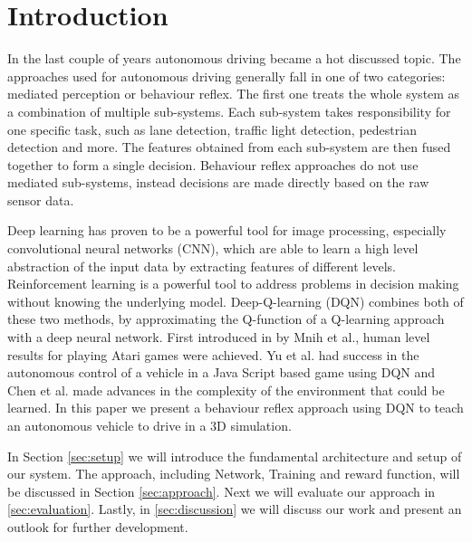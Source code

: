 
\section{Introduction}

In the last couple of years autonomous driving became a hot discussed topic. The approaches used for autonomous driving generally fall in one of two categories: mediated perception or behaviour reflex. The first one treats the whole system as a combination of multiple sub-systems. Each sub-system takes responsibility for one specific task, such as lane detection, traffic light detection, pedestrian detection and more. The features obtained from each sub-system are then fused together to form a single decision. Behaviour reflex approaches do not use mediated sub-systems, instead decisions are made directly based on the raw sensor data.

Deep learning has proven to be a powerful tool for image processing, especially convolutional neural networks (CNN), which are able to learn a high level abstraction of the input data by extracting features of different levels. Reinforcement learning is a powerful tool to address problems in decision making without knowing the underlying model. Deep-Q-learning (DQN) combines both of these two methods, by approximating the Q-function of a Q-learning approach with a deep neural network. First introduced in \cite{Mnih13} by Mnih et al., human level results for playing Atari games were achieved. Yu et al. \cite{yudeep} had success in the autonomous control of a vehicle in a Java Script based game using DQN and Chen et al. \cite{chen2015deepdriving} made advances in the complexity of the environment that could be learned. In this paper we present a behaviour reflex approach using DQN to teach an autonomous vehicle to drive in a 3D simulation. 

In Section \ref{sec:setup} we will introduce the fundamental architecture and setup of our system. The approach, including Network, Training and reward function, will be discussed in Section \ref{sec:approach}. Next we will evaluate our approach in \ref{sec:evaluation}. Lastly, in \ref{sec:discussion} we will discuss our work and present an outlook for further development.